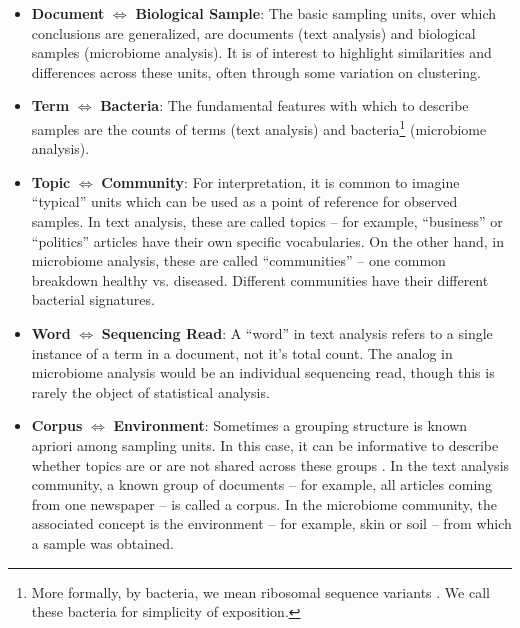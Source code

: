 \documentclass[oupdraft]{bio}
\begin{document}
\begin{itemize}
  \item \textbf{Document} $\iff$ \textbf{Biological Sample}: The basic sampling
    units, over which conclusions are generalized, are documents (text analysis)
    and biological samples (microbiome analysis). It is of interest to highlight
    similarities and differences across these units, often through some
    variation on clustering.
  \item \textbf{Term} $\iff$ \textbf{Bacteria}: The fundamental features
    with which to describe samples are the counts of terms (text analysis) and
    bacteria\footnote{More formally, by bacteria, we mean ribosomal sequence
      variants \citep{callahan2016dada2}. We call these bacteria for simplicity
      of exposition.} (microbiome analysis).
  \item \textbf{Topic} $\iff$ \textbf{Community}: For interpretation, it is
    common to imagine ``typical'' units which can be used as a point of
    reference for observed samples. In text analysis, these are called topics --
    for example, ``business'' or ``politics'' articles have their own specific
    vocabularies. On the other hand, in microbiome analysis, these are called
    ``communities'' -- one common breakdown healthy vs. diseased. Different
    communities have their different bacterial signatures.
  \item \textbf{Word} $\iff$ \textbf{Sequencing Read}: A ``word'' in text analysis refers
    to a single instance of a term in a document, not it's total count. The
    analog in microbiome analysis would be an individual sequencing read, though
    this is rarely the object of statistical analysis.
  \item \textbf{Corpus} $\iff$ \textbf{Environment}: Sometimes a grouping
    structure is known apriori among sampling units. In this case, it can be
    informative to describe whether topics are or are not shared across these
    groups \citep{teh2004sharing}. In the text analysis community, a known group
    of documents -- for example, all articles coming from one newspaper -- is
    called a corpus. In the microbiome community, the associated concept is the
    environment -- for example, skin or soil -- from which a sample was
    obtained.
\end{itemize}
\end{document}

